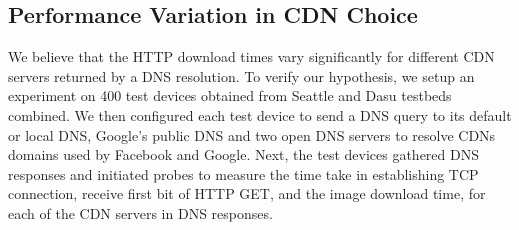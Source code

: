 \documentclass{llncs}
\begin{document}
\subsection{Performance Variation in CDN Choice}

We believe that the HTTP download times vary significantly for different CDN servers returned by a DNS resolution.
To verify our hypothesis, we setup an experiment on 400 test devices obtained from Seattle and Dasu testbeds combined.
We then configured each test device to send a DNS query to its default or local DNS, Google's public DNS and two open DNS servers to resolve CDNs domains used by Facebook and Google.
Next, the test devices gathered DNS responses and initiated probes to measure the time take in establishing TCP connection, receive first bit of HTTP GET, and the image download time, for each of the CDN servers in DNS responses.
\end{document}
